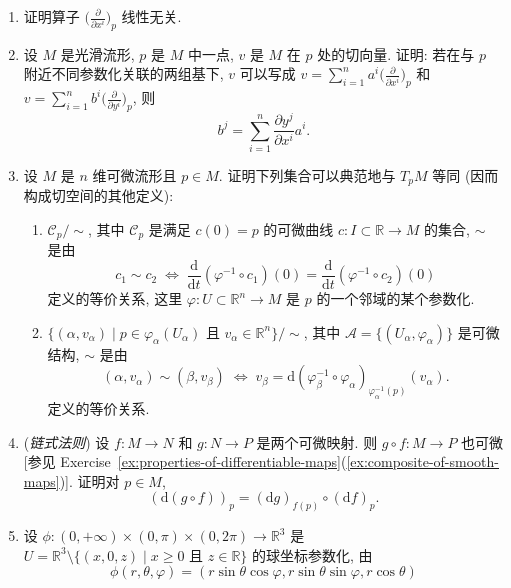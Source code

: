 \begin{RiemannExercise}\label{ex:tangent-space}
\begin{enumerate}[label=(\arabic*),ref=\arabic*,leftmargin=*]
\item\label{ex:independence-of-coordinate-tangent-vectors} 证明算子 $\bigl(\frac{\partial}{\partial x^i}\bigr)_p$ 线性无关.
\item\label{ex:change-of-tangent-basis} 设 $M$ 是光滑流形, $p$ 是 $M$ 中一点, $v$ 是 $M$ 在 $p$ 处的切向量. 证明: 若在与 $p$ 附近不同参数化关联的两组基下, $v$ 可以写成 $v=\sum_{i=1}^na^i\bigl(\frac{\partial}{\partial x^i}\bigr)_p$ 和 $v=\sum_{i=1}^nb^i\bigl(\frac{\partial}{\partial y^i}\bigr)_p$, 则
\[
  b^j=\sum_{i=1}^n\frac{\partial y^j}{\partial x^i}a^i.
\]
\item\label{ex:alternative-definitions-of-tangent-space} 设 $M$ 是 $n$ 维可微流形且 $p\in M$. 证明下列集合可以典范地与 $T_pM$ 等同 (因而构成切空间的其他定义):
\begin{enumerate}[label=(\alph*),leftmargin=*]
\item $\mathcal{C}_p/\sim$, 其中 $\mathcal{C}_p$ 是满足 $c(0)=p$ 的可微曲线 $c:I\subset\mathbb{R}\to M$ 的集合, $\sim$ 是由
\[
  c_1\sim c_2\;\Leftrightarrow\;
  \frac{\mathrm{d}}{\mathrm{d}t}(\varphi^{-1}\circ c_1)(0)
  =\frac{\mathrm{d}}{\mathrm{d}t}(\varphi^{-1}\circ c_2)(0)
\]
定义的等价关系, 这里 $\varphi:U\subset\mathbb{R}^n\to M$ 是 $p$ 的一个邻域的某个参数化.
\item $\{(\alpha,v_\alpha)\mid p\in\varphi_\alpha(U_\alpha)\text{ 且 }v_\alpha\in\mathbb{R}^n\}/\sim$, 其中 $\mathcal{A}=\{(U_\alpha,\varphi_\alpha)\}$ 是可微结构, $\sim$ 是由
\[
  (\alpha,v_\alpha)\sim(\beta,v_\beta)\;\Leftrightarrow\;
  v_\beta=\mathrm{d}(\varphi_\beta^{-1}\circ\varphi_\alpha)_{\varphi_\alpha^{-1}(p)}(v_\alpha).
\]
定义的等价关系.
\end{enumerate}
\item\label{ex:chain-rule-for-manifold-maps} (\emph{链式法则}) 设 $f:M\to N$ 和 $g:N\to P$ 是两个可微映射. 则 $g\circ f:M\to P$ 也可微 [参见 Exercise~\ref{ex:properties-of-differentiable-maps}(\ref{ex:composite-of-smooth-maps})]. 证明对 $p\in M$,
\[
  (\mathrm{d}(g\circ f))_p=(\mathrm{d}g)_{f(p)}\circ(\mathrm{d}f)_p.
\]
\item\label{ex:cartesian-components-of-spherical-coordinates} 设 $\phi:(0,+\infty)\times(0,\pi)\times(0,2\pi)\to\mathbb{R}^3$ 是 $U=\mathbb{R}^3\setminus\{(x,0,z)\mid x\geq 0\text{ 且 }z\in\mathbb{R}\}$ 的球坐标参数化, 由
\[
  \phi(r,\theta,\varphi)=(r\sin\theta\cos\varphi,r\sin\theta\sin\varphi,r\cos\theta)
\]
\end{enumerate}
\end{RiemannExercise}
